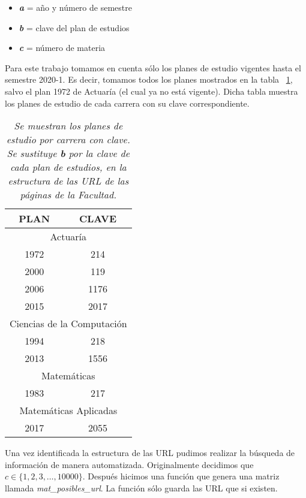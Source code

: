   \begin{itemize}
\item[ ] \textit{\textbf{a}} = año y número de semestre

\item[ ] \textit{\textbf{b}} = clave del plan de estudios

\item[ ] \textit{\textbf{c}} = número de materia
\end{itemize}

Para este trabajo tomamos en cuenta sólo los planes de estudio vigentes hasta el semestre 2020-1. Es decir, tomamos todos los planes mostrados en la tabla \tablename{~\ref{PlanesEstudio}}, salvo el plan 1972 de Actuaría (el cual ya no está vigente). Dicha tabla muestra los planes de estudio de cada carrera con su clave correspondiente.

\begin{table}[h]
\centering
\begin{tabular}{|c|c|}
\hline 
\textbf{PLAN} & \textbf{CLAVE} \\ 
\hline 
\multicolumn{2}{|c|}{Actuaría} \\ 
\hline 
1972 & 214 \\ 
\hline 
2000 & 119 \\ 
\hline 
2006 & 1176 \\ 
\hline 
2015 & 2017 \\ 
\hline 
\multicolumn{2}{|c|}{Ciencias de la Computación} \\ 
\hline 
1994 & 218 \\ 
\hline 
2013 & 1556 \\ 
\hline 
\multicolumn{2}{|c|}{Matemáticas} \\ 
\hline 
1983 & 217 \\ 
\hline 
\multicolumn{2}{|c|}{Matemáticas Aplicadas} \\ 
\hline 
2017 & 2055 \\ 
\hline 
\end{tabular}
\caption[\textit{Planes de estudio por carrera con clave}]{\textit{Se muestran los planes de estudio por carrera con clave. Se sustituye \textbf{b} por la clave de cada plan de estudios, en la estructura de las URL de las páginas de la Facultad.}}\label{PlanesEstudio}
\end{table}

Una vez identificada la estructura de las URL pudimos realizar la búsqueda de información de manera automatizada. Originalmente decidimos que $c \in \{1,2,3, \ldots, 10 000\}$. Después hicimos una función que genera una matriz llamada \textit{mat\_posibles\_url}. La función sólo guarda las URL que si existen.

